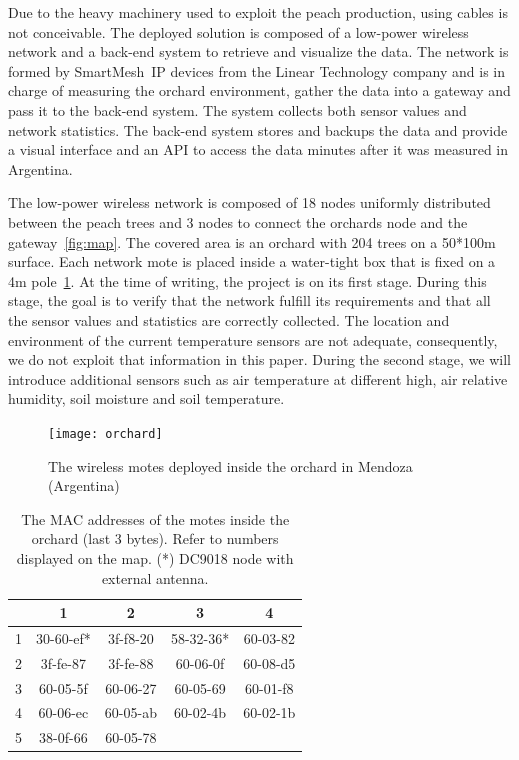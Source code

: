 \documentclass{sig-alternate}
\newcommand{\smip}                  {SmartMesh~IP\xspace}
\begin{document}

Due to the heavy machinery used to exploit the peach production, using cables is not conceivable.
The deployed solution is composed of a low-power wireless network and a back-end system to retrieve and visualize the data.
The network is formed by \smip devices from the Linear Technology company and is in charge of measuring the orchard environment, gather the data into a gateway and pass it to the back-end system.
The system collects both sensor values and network statistics.
The back-end system stores and backups the data and provide a visual interface and an API to access the data minutes after it was measured in Argentina.


The low-power wireless network is composed of 18 nodes uniformly distributed between the peach trees and 3 nodes to connect the orchards node and the gateway~\ref{fig:map}.
The covered area is an orchard with 204 trees on a 50*100m surface.
Each network mote is placed inside a water-tight box that is fixed on a 4m pole~\ref{fig:orchard}.
At the time of writing, the project is on its first stage.
During this stage, the goal is to verify that the network fulfill its requirements and that all the sensor values and statistics are correctly collected.
The location and environment of the current temperature sensors are not adequate, consequently, we do not exploit that information in this paper.
During the second stage, we will introduce additional sensors such as air temperature at different high, air relative humidity, soil moisture and soil temperature.

\begin{figure}
    \centering
    \texttt{[image: orchard]}
    \caption{The wireless motes deployed inside the orchard in Mendoza (Argentina)}
    \label{fig:orchard}
\end{figure}

\begin{table}
\begin{center}
    \begin{tabular}{ | c | c | c | c | c |}
         \hline
           & 1 & 2 & 3 & 4\\
         \hline
         1 & 30-60-ef* & 3f-f8-20 & 58-32-36* & 60-03-82 \\
         2 & 3f-fe-87  & 3f-fe-88 & 60-06-0f  & 60-08-d5 \\
         3 & 60-05-5f  & 60-06-27 & 60-05-69  & 60-01-f8 \\
         4 & 60-06-ec  & 60-05-ab & 60-02-4b  & 60-02-1b \\
         5 & 38-0f-66  & 60-05-78 &           &          \\
         \hline
    \end{tabular}
    \caption{The MAC addresses of the motes inside the orchard (last 3 bytes). Refer to numbers displayed on the map. (*) DC9018 node with external antenna.}
\end{center}
\end{table}
\end{document}
